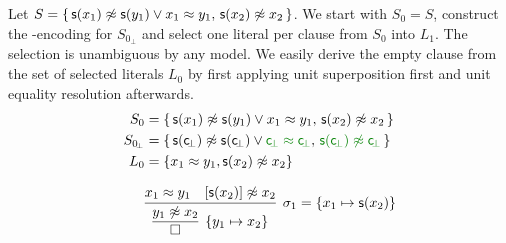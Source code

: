 \begin{example}\label{ex:nat:instgeneq}
	Let \( S = \{ \, \mathsf{s}(x_1) \not\approx \mathsf{s} (y_1) \lor x_1 \approx y_1, \, \mathsf{s}(x_2)\not\approx x_2 \, \} \).
	We start with \( S_0 = S \), construct the \SMT-encoding for \( S_{0\!_\bot} \)
	and select one literal per clause from \( S_0 \) into \( L_1 \).
	The selection is unambiguous by any model.
	We easily derive the empty clause from the set of selected literals \( L_0 \)
	by first applying unit superposition first and unit equality resolution afterwards.
\begin{align*}
	S_0 &= \{ \, {\msucc(x_1) \mNE \msucc (y_1) \lor x_1 \mEQ y_1}, \, \msucc(x_2)\mNE x_2 \, \}
	\\
	S_{0\!_\bot} &= \{ \, \msucc(\consbot) \mNE \msucc (\consbot) \lor{\colHi\consbot \mEQ \consbot}, \,
	{\colHi \msucc(\consbot)\mNE \consbot} \, \}
	\\
	L_0 &= \{ x_1\mEQ y_1, \msucc(x_2)\mNE x_2 \}
	\\[0.7em]
	&\infer[\sigma_1 = \{ x_1\mapsto \msucc(x_2)\}
	]{
		\infer[ \{ y_1\mapsto x_2\}]{\emptyclause}{ {y_1}\mNE x_2 }
	}
	{x_1 \mEQ y_1 & [{\msucc(x_2)}]\mNE x_2}
	\\[0.7em]
\end{align*}


\end{example}
